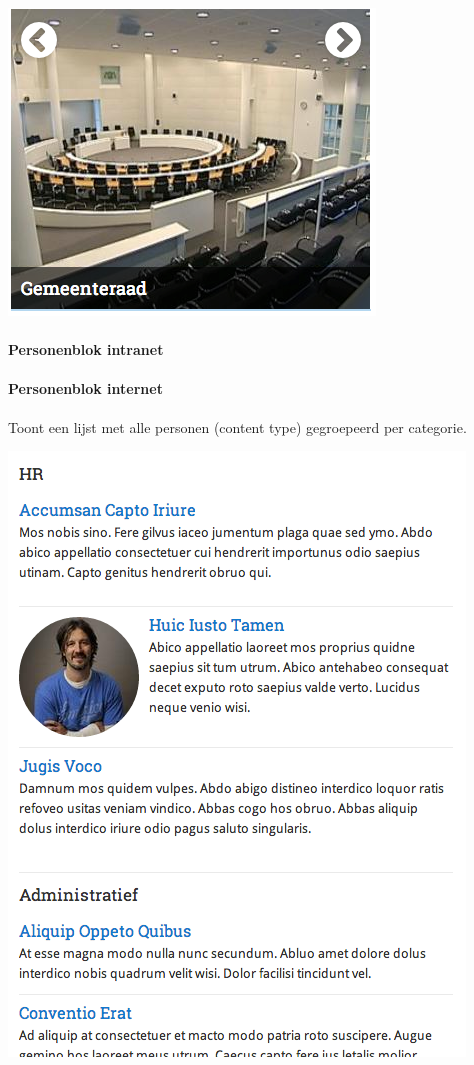 \begin{center}
	\includegraphics[scale=0.5]{img/blokken/carrouselsmal.png}
\end{center}

\paragraph{Personenblok intranet}

\paragraph{Personenblok internet}\label{personenblokinternet}

Toont een lijst met alle personen (content type) gegroepeerd per categorie.

\begin{center}
	\includegraphics[scale=0.5]{img/blokken/personeninternet.png}
\end{center}

